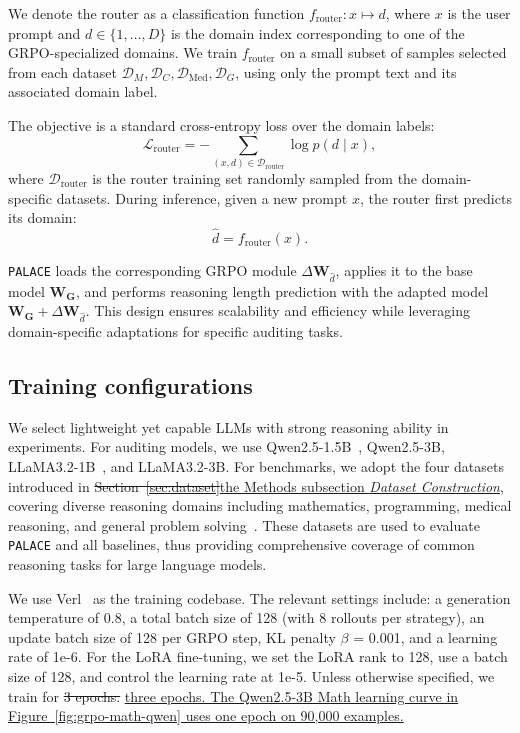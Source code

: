 \documentclass[pdflatex,sn-mathphys-num]{sn-jnl}%
\makeatletter
\newcommand{\n}{\texttt{PALACE}\xspace}
\theoremstyle{thmstyleone}%
\theoremstyle{thmstyletwo}%
\theoremstyle{thmstylethree}%
\DeclareRobustCommand{\DIFadd}[1]{{\protect\color{blue}\uline{#1}}} %
\DeclareRobustCommand{\DIFdel}[1]{{\protect\color{red}\sout{#1}}} %
\providecommand{\DIFaddbegin}{} %
\providecommand{\DIFaddend}{} %
\providecommand{\DIFdelbegin}{} %
\providecommand{\DIFdelend}{} %
\let\sout@orig\sout %
\renewcommand{\sout}[1]{\ifmmode\text{\sout@orig{\ensuremath{#1}}}\else\sout@orig{#1}\fi} %
\makeatother
\begin{document}
We denote the router as a classification function \( f_{\text{router}}: x \mapsto d \), where \(x\) is the user prompt and \(d \in \{1, \dots, D\}\) is the domain index corresponding to one of the GRPO-specialized domains. We train \(f_{\text{router}}\) on a small subset of samples selected from each dataset \(\mathcal{D}_M, \mathcal{D}_C, \mathcal{D}_{\text{Med}}, \mathcal{D}_G\), using only the prompt text and its associated domain label.

The objective is a standard cross-entropy loss over the domain labels:
\begin{equation}
\mathcal{L}_{\text{router}} = - \sum_{(x, d) \in \mathcal{D}_{\text{router}}} \log p(d \mid x),
\end{equation}
where \(\mathcal{D}_{\text{router}}\) is the router training set randomly sampled from the domain-specific datasets.
During inference, given a new prompt \(x\), the router first predicts its domain:
\begin{equation}
\hat{d} = f_{\text{router}}(x).
\end{equation}

{\n} loads the corresponding GRPO module \(\Delta \mathbf{W}_{\hat{d}}\), applies it to the base model \(\mathbf{W_G}\), and performs reasoning length prediction with the adapted model \(\mathbf{W_G} + \Delta \mathbf{W}_{\hat{d}}\).
This design ensures scalability and efficiency while leveraging domain-specific adaptations for specific auditing tasks.

\subsection{Training configurations}

We select lightweight yet capable LLMs with strong reasoning ability in experiments. For auditing models, we use Qwen2.5-1.5B~\citep{qwen2.5}, Qwen2.5-3B, LLaMA3.2-1B~\citep{dubey2024llama}, and LLaMA3.2-3B. For benchmarks, we adopt the four datasets introduced in \DIFdelbegin \DIFdel{Section~\ref{sec:dataset}}\DIFdelend \DIFaddbegin \DIFadd{the Methods subsection }\emph{\DIFadd{Dataset Construction}}\DIFaddend , covering diverse reasoning domains including mathematics, programming, medical reasoning, and general problem solving~\citep{openr1}. These datasets are used to evaluate {\n} and all baselines, thus providing comprehensive coverage of common reasoning tasks for large language models.

We use Verl~\citep{sheng2024hybridflow} as the training codebase. The relevant settings include: a generation temperature of 0.8, a total batch size of 128 (with 8 rollouts per strategy), an update batch size of 128 per GRPO step, KL penalty $\beta$ = 0.001, and a learning rate of 1e-6.
For the LoRA fine-tuning, we set the LoRA rank to 128, use a batch size of 128, and control the learning rate at 1e-5.
Unless otherwise specified, we train for \DIFdelbegin \DIFdel{3 epochs. }\DIFdelend \DIFaddbegin \DIFadd{three epochs. The Qwen2.5-3B Math learning curve in Figure~\ref{fig:grpo-math-qwen} uses one epoch on 90,000 examples.
}\DIFaddend
\end{document}
